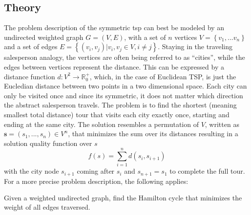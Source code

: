 \subsection{Theory}
\label{chap:tsp-theory}
The problem description of the symmetric \gls{tsp}  can best be modeled by an undirected weighted graph $G = (V,E)$, with a set of $n$ vertices $V = \left\lbrace v_1, ... v_n\right\rbrace $ and a set of edges $E = \left\lbrace (v_i,v_j) | v_i,v_j \in V, i \neq j\right\rbrace $. Staying in the traveling salesperson analogy, the vertices are often being referred to as \enquote{cities}, while the edges between vertices represent the distance. This can be expressed by a distance function $d : V^2 \rightarrow \mathbb{R}_{0}^{+}$, which, in the case of Euclidean TSP, is just the Eucledian distance between two points in a two dimensional space.  Each city can only be visited once and since its symmetric, it does not matter which direction the abstract salesperson travels. The problem is to find the shortest (meaning smallest total distance) tour that visits each city exactly once, starting and ending at the same city. The solution resembles a permutation of $V$, written as $\textbf{s} = (s_1,...,s_n) \in V^n$, that minimizes the sum over its distances resulting in a solution quality function over $s$
\begin{equation}
	\label{eq:solution_quality}
	f(s) = \sum_{i=1}^{n} d(s_i,s_{i+1}) 
\end{equation}
with the city node $s_{i+1}$ coming after $s_i$ and $s_{n+1} = s_1$ to complete the full tour.
For a more precise problem description, the following applies: 


\begin{list}{}{}
	\item 	Given a weighted undirected graph, find the Hamilton cycle that minimizes the weight of all edges traversed.
\end{list}

